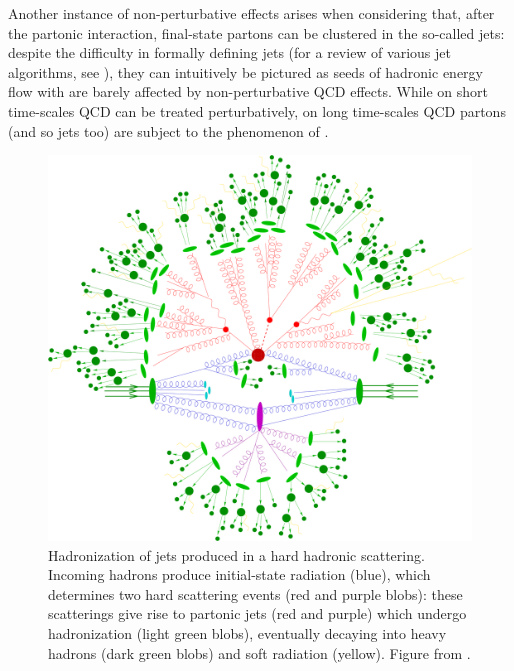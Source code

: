Another instance of non-perturbative effects arises when considering that, after the partonic interaction, final-state partons can be clustered in the so-called jets: despite the difficulty in formally defining jets (for a review of various jet algorithms, see \cite{Salam-2010}), they can intuitively be pictured as seeds of hadronic energy flow with are barely affected by non-perturbative QCD effects. While on short time-scales QCD can be treated perturbatively, on long time-scales QCD partons (and so jets too) are subject to the phenomenon of .

\begin{figure}
  \centering
  \includegraphics[width = 1.00 \textwidth]{imgs/hadr-scatt.pdf}
  \caption{Hadronization of jets produced in a hard hadronic scattering. Incoming hadrons produce initial-state radiation (blue), which determines two hard scattering events (red and purple blobs): these scatterings give rise to partonic jets (red and purple) which undergo hadronization (light green blobs), eventually decaying into heavy hadrons (dark green blobs) and soft radiation (yellow). Figure from \cite{Hoche-2014}.}
  \label{fig:hadr-scatt}
\end{figure}

